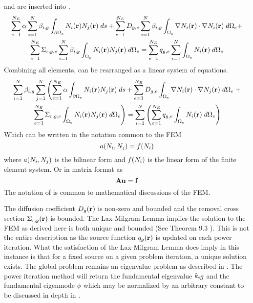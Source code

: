      and  are inserted 
    into .
    \begin{multline}
      \label{eq:this_above}
      \sum_{e=1}^{N_E} \alpha \sum_{i=1}^{N} \beta_{i,g}
        \int_{\partial \Omega_e}
        N_i(\mathbf{r})  N_j(\mathbf{r}) \;ds +
        \sum_{e=1}^{N_E} D_{g,e} \sum_{i=1}^{N} \beta_{i,g}
        \int_{\Omega_e} \mathbf{\nabla} N_i(\mathbf{r}) \cdot \mathbf{\nabla} N_i(\mathbf{r})\;d\Omega_e
        + \\
        \sum_{e=1}^{N_E} \Sigma_{r,g,e} \sum_{i=1}^{N} \beta_{i,g}
        \int_{\Omega_e} N_i(\mathbf{r}) N_j(\mathbf{r}) \; d\Omega_e =
        \sum_{e=1}^{N_E} q_{g,e} \sum_{i=1}^{N} 
        \int_{\Omega_e} N_i(\mathbf{r}) \; d\Omega_e
    \end{multline}
    Combining all elements,  can be rearranged as a linear
    system of equations.
    \begin{multline}
      \sum_{i=1}^{N} \beta_{i,g} \sum_{j=1}^{N} \left(
        \sum_{e=1}^{N_E} \alpha \int_{\partial \Omega_e}
        N_i(\mathbf{r})  N_j(\mathbf{r}) \;ds +
        \sum_{e=1}^{N_E} D_{g,e} 
        \int_{\Omega_e} \mathbf{\nabla} N_i(\mathbf{r}) \cdot \mathbf{\nabla} N_j(\mathbf{r})\;d\Omega_e
        \right.
        + \\
        \left.
        \sum_{e=1}^{N_E} \Sigma_{r,g,e}
        \int_{\Omega_e} N_i(\mathbf{r}) N_j(\mathbf{r}) \; d\Omega_e \right) =
        \sum_{i=1}^{N} \left(
        \sum_{e=1}^{N_E} q_{g,e} 
        \int_{\Omega_e} N_i(\mathbf{r}) \; d\Omega_e \right)
    \end{multline}
    Which can be written in the notation common to the FEM
      \begin{equation}
        \label{eq:fem_notation}
        a(N_i,N_j) = f(N_i)
      \end{equation}
    where $a(N_i,N_j)$ is the bilinear form and $f(N_i)$ is the 
    linear form of the finite element system.
    Or in matrix format as
    \begin{equation}
      \label{eq:matrix_notation}
      \mathbf{A} \mathbf{u} = \mathbf{f}
    \end{equation}
    The notation of  is common to mathematical discussions
    of the FEM. 
    
    The diffusion coefficient $D_g(\mathbf{r})$ is non-zero and bounded and
    the removal cross section $\Sigma_{r,g}(\mathbf{r})$ is bounded. The Lax-Milgram 
    Lemma implies the solution to the FEM as derived here is both unique and 
    bounded (See Theorem 9.3 \cite{textbookli}). This is 
    not the entire description as the source function $q_g(\mathbf{r})$ is updated on 
    each power iteration. What the satisfaction of the Lax-Milgram Lemma does 
    imply in this instance is that for a fixed source on a given problem 
    iteration, a unique solution exists. The global problem remains an 
    eigenvalue problem as described in \cite{duderstathamilton}. The power
    iteration method will 
    return the fundamental eigenvalue $k_{\!\mbox{\scriptsize \em eff}}$ and the fundamental 
    eigenmode $\phi$ which may be normalized by an arbitrary constant to be
    discussed in depth in .
    
